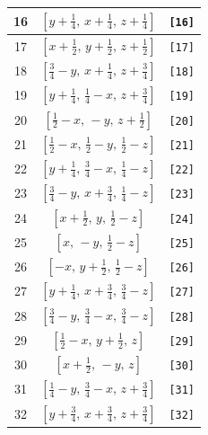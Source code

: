 \documentclass[fleqn,8pt]{jsarticle}
\begin{document}
\begin{longtable}{ccc}
16 & $\left[ y + \frac{1}{4},\, x + \frac{1}{4},\, z + \frac{1}{4} \right]$ & {\tt [16]} \\ \hline
17 & $\left[ x + \frac{1}{2},\, y + \frac{1}{2},\, z + \frac{1}{2} \right]$ & {\tt [17]} \\ \hline
18 & $\left[ \frac{3}{4} - y,\, x + \frac{1}{4},\, z + \frac{3}{4} \right]$ & {\tt [18]} \\ \hline
19 & $\left[ y + \frac{1}{4},\, \frac{1}{4} - x,\, z + \frac{3}{4} \right]$ & {\tt [19]} \\ \hline
20 & $\left[ \frac{1}{2} - x,\, - y,\, z + \frac{1}{2} \right]$ & {\tt [20]} \\ \hline
21 & $\left[ \frac{1}{2} - x,\, \frac{1}{2} - y,\, \frac{1}{2} - z \right]$ & {\tt [21]} \\ \hline
22 & $\left[ y + \frac{1}{4},\, \frac{3}{4} - x,\, \frac{1}{4} - z \right]$ & {\tt [22]} \\ \hline
23 & $\left[ \frac{3}{4} - y,\, x + \frac{3}{4},\, \frac{1}{4} - z \right]$ & {\tt [23]} \\ \hline
24 & $\left[ x + \frac{1}{2},\, y,\, \frac{1}{2} - z \right]$ & {\tt [24]} \\ \hline
25 & $\left[ x,\, - y,\, \frac{1}{2} - z \right]$ & {\tt [25]} \\ \hline
26 & $\left[ - x,\, y + \frac{1}{2},\, \frac{1}{2} - z \right]$ & {\tt [26]} \\ \hline
27 & $\left[ y + \frac{1}{4},\, x + \frac{3}{4},\, \frac{3}{4} - z \right]$ & {\tt [27]} \\ \hline
28 & $\left[ \frac{3}{4} - y,\, \frac{3}{4} - x,\, \frac{3}{4} - z \right]$ & {\tt [28]} \\ \hline
29 & $\left[ \frac{1}{2} - x,\, y + \frac{1}{2},\, z \right]$ & {\tt [29]} \\ \hline
30 & $\left[ x + \frac{1}{2},\, - y,\, z \right]$ & {\tt [30]} \\ \hline
31 & $\left[ \frac{1}{4} - y,\, \frac{3}{4} - x,\, z + \frac{3}{4} \right]$ & {\tt [31]} \\ \hline
32 & $\left[ y + \frac{3}{4},\, x + \frac{3}{4},\, z + \frac{3}{4} \right]$ & {\tt [32]} \\
\end{longtable}
\end{document}
